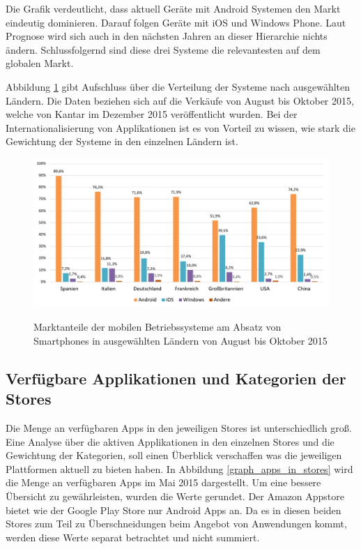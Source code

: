 Die Grafik verdeutlicht, dass aktuell Geräte mit Android Systemen den Markt eindeutig dominieren. Darauf folgen Geräte mit iOS und Windows Phone. Laut Prognose wird sich auch in den nächsten Jahren an dieser Hierarchie nichts ändern. Schlussfolgernd sind diese drei Systeme die relevantesten auf dem globalen Markt.

Abbildung \ref{graph_mobile_systems_laender} gibt Aufschluss über die Verteilung der Systeme nach ausgewählten Ländern. Die Daten beziehen sich auf die Verkäufe von August bis Oktober 2015, welche von Kantar im Dezember 2015 veröffentlicht wurden. Bei der Internationalisierung von Applikationen ist es von Vorteil zu wissen, wie stark die Gewichtung der Systeme in den einzelnen Ländern ist.

\begin{figure}[htbp]
	\centering
	\includegraphics[width=1\textwidth]{Bilder/Marktanteile_nach_Laendern}
	\caption{Marktanteile der mobilen Betriebssysteme am Absatz von Smartphones in ausgewählten Ländern von August bis Oktober 2015}\label{graph_mobile_systems_laender}\citep{marktanteile_betriebssysteme_laender}
\end{figure}

\subsection{Verfügbare Applikationen und Kategorien der Stores}
Die Menge an verfügbaren Apps in den jeweiligen Stores ist unterschiedlich groß.
Eine Analyse über die aktiven Applikationen in den einzelnen Stores und die Gewichtung der Kategorien, soll einen Überblick verschaffen was die jeweiligen Plattformen aktuell zu bieten haben.
In Abbildung \ref{graph_apps_in_stores} wird die Menge an verfügbaren Apps im Mai 2015 dargestellt. Um eine bessere Übersicht zu gewährleisten, wurden die Werte gerundet. Der Amazon Appstore bietet wie der Google Play Store nur Android Apps an. Da es in diesen beiden Stores zum Teil zu Überschneidungen beim Angebot von Anwendungen kommt, werden diese Werte separat betrachtet und nicht summiert.

